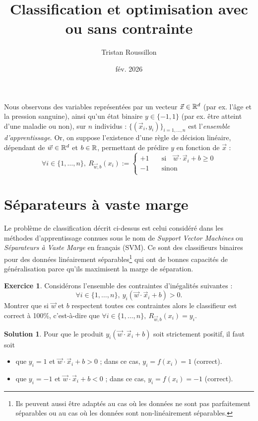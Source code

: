 \documentclass[a4paper,francais]{article}
\title{Classification et optimisation avec ou sans contrainte}
\author{Tristan Roussillon}
\date{fév. 2026}
\newcommand{\R}{{\ensuremath\mathbb{R}}}
\theoremstyle{definition}
\newtheorem{exercice}{Exercice}[section]
\newtheorem*{solution}{Solution}
\begin{document}
\maketitle

Nous observons des variables représentées par un vecteur $\vec{x} \in \R^d$
(par ex. l'âge et la pression sanguine), ainsi qu'un état binaire $y \in \{-1,1\}$
(par ex. être atteint d'une maladie ou non), sur $n$ individus :
$\{(\vec{x}_i,y_i)\}_{i = 1,\dots, n}$ est l'\emph{ensemble d'apprentissage}.
Or, on suppose l'existence d'une règle de décision linéaire, dépendant de
$\vec{w} \in \R^d$ et $b \in \R$, permettant de prédire $y$
en fonction de $\vec{x}$ :
\[
\forall i \in \{1,\dots,n\}, \ R_{\vec{w},b}(x_i) :=
\left\{
\begin{array}{ll}
  +1 & \quad \mathrm{si}\quad \vec{w}\cdot\vec{x}_i + b \geq 0 \\
  -1 & \quad \mathrm{sinon} \\
\end{array}
\right.
\]

\section{Séparateurs à vaste marge}
\label{sec:svm}

Le problème de classification décrit ci-dessus est celui considéré dans les
méthodes d'apprentissage connues sous le nom de \emph{Support Vector Machines}
ou \emph{Séparateurs à Vaste Marge} en français (SVM).
Ce sont des classifieurs binaires pour des données linéairement séparables\footnote{Ils
peuvent aussi être adaptés au cas où les données ne sont pas parfaitement séparables
ou au cas où les données sont non-linéairement séparables.} 
qui ont de bonnes capacités de généralisation parce qu'ils maximisent
la marge de séparation.

\begin{exercice}
  Considérons l'ensemble des contraintes d'inégalités suivantes :
  \[ \forall i \in \{1,\dots,n\}, \  y_i( \vec{w}\cdot\vec{x}_i + b ) > 0. \]
  Montrer que si $\vec{w}$ et $b$ respectent toutes ces contraintes alors
  le classifieur est correct à 100\%, c'est-à-dire que 
  $\forall i \in \{1,\dots,n\}, \ R_{\vec{w},b}(x_i) = y_i$. 
\end{exercice}

\begin{solution}
  Pour que le produit $y_i( \vec{w}\cdot\vec{x}_i + b )$
  soit strictement positif, il faut soit
  \begin{itemize}
  \item que $y_i = 1$ et $\vec{w}\cdot\vec{x}_i + b > 0$ ; 
    dans ce cas, $y_i = f(x_i) = 1$ (correct).
  \item que $y_i = -1$ et $\vec{w}\cdot\vec{x}_i + b < 0$ ;
    dans ce cas, $y_i = f(x_i) = -1$ (correct).
  \end{itemize}
\end{solution}
\end{document}
